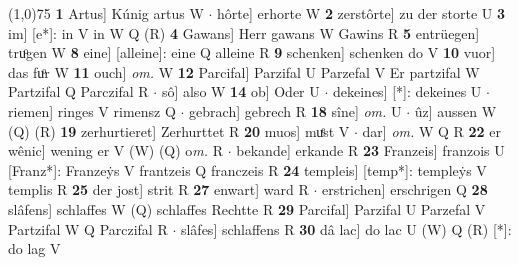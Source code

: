 \documentclass[8pt,a4paper,notitlepage]{article}
\begin{document}
\begin{table}[ht]
\begin{minipage}[t]{0.5\linewidth}
\line(1,0){75} \newline
\textbf{1} Artus] Kúnig artus W  $\cdot$ hôrte] erhorte W \textbf{2} zerstôrte] zu der storte U \textbf{3} im] [e*]: in V in W Q (R) \textbf{4} Gawans] Herr gawans W Gawins R \textbf{5} entrüegen] truͦgen W \textbf{8} eine] [alleine]: eine Q alleine R \textbf{9} schenken] schenken do V \textbf{10} vuor] das fuͦr W \textbf{11} ouch] \textit{om.} W \textbf{12} Parcifal] Parzifal U Parzefal V Er partzifal W Partzifal Q Parczifal R  $\cdot$ sô] also W \textbf{14} ob] Oder U  $\cdot$ dekeines] [*]: dekeines U  $\cdot$ riemen] ringes V rimensz Q  $\cdot$ gebrach] gebrech R \textbf{18} sîne] \textit{om.} U  $\cdot$ ûz] aussen W (Q) (R) \textbf{19} zerhurtieret] Zerhurttet R \textbf{20} muos] muͤst V  $\cdot$ dar] \textit{om.} W Q R \textbf{22} er wênic] wening er V (W) (Q) o\textit{m. } R  $\cdot$ bekande] erkande R \textbf{23} Franzeis] franzois U [Franz*]: Franzeẏs V frantzeis Q franczeis R \textbf{24} templeis] [temp*]: templeẏs V templis R \textbf{25} der jost] strit R \textbf{27} enwart] ward R  $\cdot$ erstrichen] erschrigen Q \textbf{28} slâfens] schlaffes W (Q) schlaffes Rechtte R \textbf{29} Parcifal] Parzifal U Parzefal V Partzifal W Q Parczifal R  $\cdot$ slâfes] schlaffens R \textbf{30} dâ lac] do lac U (W) Q (R) [*]: do lag  V \newline
\end{minipage}
\end{table}
\end{document}
